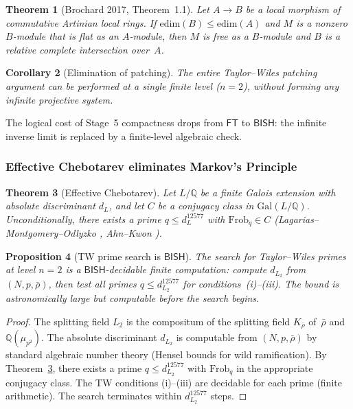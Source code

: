 \documentclass[11pt]{article}
\theoremstyle{plain}
\newtheorem{theorem}{Theorem}[section]
\newtheorem{proposition}[theorem]{Proposition}
\newtheorem{corollary}[theorem]{Corollary}
\theoremstyle{definition}
\theoremstyle{remark}
\newcommand{\Q}{\mathbb{Q}}
\newcommand{\Gal}{\mathrm{Gal}}
\newcommand{\Frob}{\mathrm{Frob}}
\newcommand{\edim}{\mathrm{edim}}
\newcommand{\BISH}{\mathsf{BISH}}
\newcommand{\FT}{\mathsf{FT}}
\begin{document}
\begin{theorem}[Brochard 2017, Theorem~1.1]\label{thm:brochard}
Let $A \to B$ be a local morphism of commutative Artinian local
rings.  If $\edim(B) \le \edim(A)$ and $M$ is a nonzero
$B$-module that is flat as an $A$-module, then $M$ is free as
a $B$-module and $B$ is a relative complete intersection
over~$A$.
\end{theorem}

\begin{corollary}[Elimination of patching]\label{cor:brochard}
The entire Taylor--Wiles patching argument can be performed at a
single finite level ($n = 2$), without forming any infinite
projective system.
\end{corollary}

The logical cost of Stage~5 compactness drops from $\FT$ to
$\BISH$: the infinite inverse limit is replaced by a finite-level
algebraic check.

\subsubsection{Effective Chebotarev eliminates Markov's Principle}

\begin{theorem}[Effective Chebotarev]\label{thm:cheb}
Let $L/\Q$ be a finite Galois extension with absolute discriminant
$d_L$, and let $C$ be a conjugacy class in $\Gal(L/\Q)$.
Unconditionally, there exists a prime $q \le d_L^{12577}$
with $\Frob_q \in C$
(Lagarias--Montgomery--Odlyzko \cite{LMO1979},
Ahn--Kwon \cite{AhnKwon2019}).
\end{theorem}

\begin{proposition}[TW prime search is $\BISH$]\label{prop:tw}
The search for Taylor--Wiles primes at level $n = 2$ is a
$\BISH$-decidable finite computation: compute $d_{L_2}$ from
$(N, p, \bar{\rho})$, then test all primes
$q \le d_{L_2}^{12577}$ for conditions~(i)--(iii).
The bound is astronomically large but computable before the
search begins.
\end{proposition}

\begin{proof}
The splitting field $L_2$ is the compositum of the splitting field
$K_{\bar{\rho}}$ of~$\bar{\rho}$ and $\Q(\mu_{p^2})$.  The
absolute discriminant $d_{L_2}$ is computable from $(N, p,
\bar{\rho})$ by standard algebraic number theory (Hensel bounds for
wild ramification).  By Theorem~\ref{thm:cheb}, there exists a
prime $q \le d_{L_2}^{12577}$ with $\Frob_q$ in the appropriate
conjugacy class.  The TW conditions (i)--(iii) are decidable for
each prime (finite arithmetic).  The search terminates within
$d_{L_2}^{12577}$ steps.
\end{proof}
\end{document}
